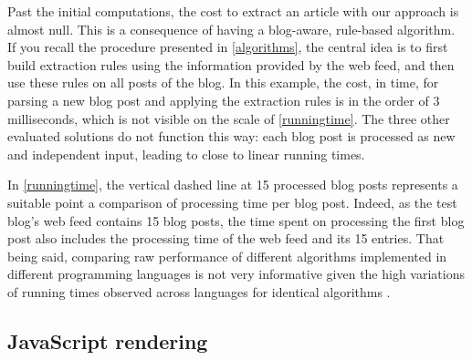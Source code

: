 

Past the initial computations, the cost to extract an article with our approach is almost null. This is a consequence of having a blog-aware, rule-based algorithm. If you recall the procedure presented in \autoref{algorithms}, the central idea is to first build extraction rules using the information provided by the web feed, and then use these rules on all posts of the blog. In this example, the cost, in time, for parsing a new blog post and applying the extraction rules is in the order of 3 milliseconds, which is not visible on the scale of \autoref{runningtime}. The three other evaluated solutions do not function this way: each blog post is processed as new and independent input, leading to close to linear running times.

In \autoref{runningtime}, the vertical dashed line at 15 processed blog posts represents a suitable point a comparison of processing time per blog post. Indeed, as the test blog's web feed contains 15 blog posts, the time spent on processing the first blog post also includes the processing time of the web feed and its 15 entries. That being said, comparing raw performance of different algorithms implemented in different programming languages is not very informative given the high variations of running times observed across languages for identical algorithms \cite{hundt2011}.



\subsection{JavaScript rendering}






